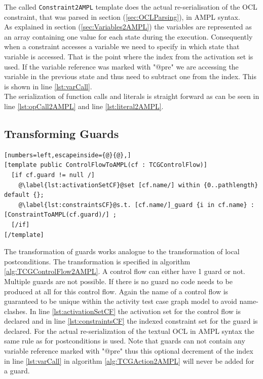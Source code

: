 The called \verb=Constraint2AMPL= template does the actual re-serialisation of the OCL constraint, that was parsed in section (\ref{sec:OCLParsing}), in AMPL syntax.\\
As explained in section (\ref{sec:Variables2AMPL}) the variables are represented as an array containing one value for each state during the execution. Consequently when a constraint accesses a variable we need to specify in which state that variable is accessed. That is the point where the index from the activation set is used. If the variable reference was marked with "@pre" we are accessing the variable in the previous state and thus need to subtract one from the index. This is shown in line \ref{lst:varCall}.\\
The serialization of function calls and literals is straight forward as can be seen in line \ref{lst:opCall2AMPL} and line \ref{lst:literal2AMPL}.

\subsection{Transforming Guards}
\label{sec:Guards2AMPL}
\begin{algorithm}
\begin{lstlisting}[numbers=left,escapeinside={@}{@},]
[template public ControlFlowToAMPL(cf : TCGControlFlow)]
  [if cf.guard != null /]
    @\label{lst:activationSetCF}@set [cf.name/] within {0..pathlength} default {};
    @\label{lst:constraintsCF}@s.t. [cf.name/]_guard {i in cf.name} : [ConstraintToAMPL(cf.guard)/] ;
  [/if]
[/template]
\end{lstlisting}
\caption{Model to text transformation from TCGControlFlow to AMPL model}
\label{alg:TCGControlFlow2AMPL}
\end{algorithm}
The transformation of guards works analogue to the transformation of local postconditions. The transformation is specified in algorithm \ref{alg:TCGControlFlow2AMPL}. A control flow can either have 1 guard or not. Multiple guards are not possible. If there is no guard no code needs to be produced at all for this control flow. Again the name of a control flow is guaranteed to be unique within the activity test case graph model to avoid name-clashes. In line \ref{lst:activationSetCF} the activation set for the control flow is declared and in line \ref{lst:constraintsCF} the indexed constraint set for the guard is declared. For the actual re-serialization of the textual OCL in AMPL syntax the same rule as for postconditions is used. Note that guards can not contain any variable reference marked with "@pre" thus this optional decrement of the index in line \ref{lst:varCall} in algorithm \ref{alg:TCGAction2AMPL} will never be added for a guard.

